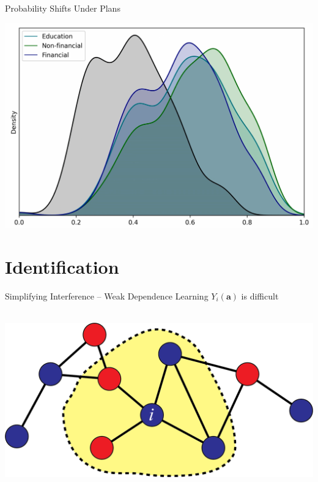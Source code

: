\documentclass{beamer}
\begin{document}
\begin{frame}{Probability Shifts Under Plans}
	\begin{center}
		\includegraphics[width=0.99\linewidth]{images/policies.png}
	\end{center}	
\end{frame}

\section{Identification}

\begin{frame}{Simplifying Interference -- Weak Dependence}
	Learning $Y_i(\mathbf{a})$ is difficult
	~\\~\\
	\begin{center}
		\includegraphics[width=0.90\linewidth]{images/WeakDependence.png}
	\end{center}
\end{frame}
\end{document}
